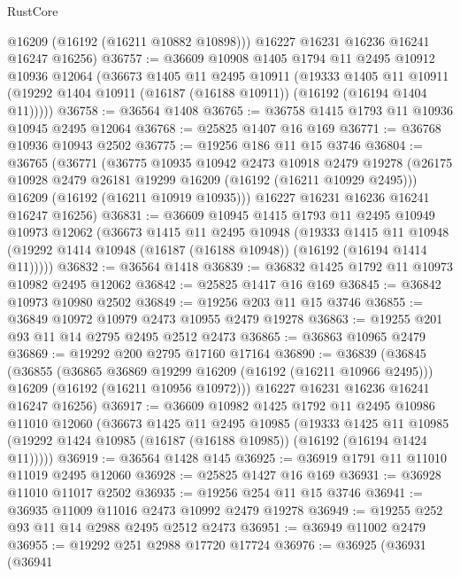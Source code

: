 \begin{lexlean}{RustCore}
\begin{coremodule}
        @16209
        (@16192 (@16211 @10882 @10898)))
      @16227
      @16231
      @16236
      @16241
      @16247
      @16256)
@36757 := @36609
    @10908
    @1405
    @1794
    @11
    @2495
    @10912
    @10936
    @12064
    (@36673
      @1405
      @11
      @2495
      @10911
      (@19333
        @1405
        @11
        @10911
        (@19292 @1404 @10911 (@16187 (@16188 @10911)) (@16192 (@16194 @1404 @11)))))
@36758 := @36564 @1408
@36765 := @36758 @1415 @1793 @11 @10936 @10945 @2495 @12064
@36768 := @25825 @1407 @16 @169
@36771 := @36768 @10936 @10943 @2502
@36775 := @19256 @186 @11 @15 @3746
@36804 := @36765
    (@36771
      (@36775
        @10935
        @10942
        @2473
        @10918
        @2479
        @19278
        (@26175 @10928 @2479 @26181 @19299 @16209 (@16192 (@16211 @10929 @2495)))
        @16209
        (@16192 (@16211 @10919 @10935)))
      @16227
      @16231
      @16236
      @16241
      @16247
      @16256)
@36831 := @36609
    @10945
    @1415
    @1793
    @11
    @2495
    @10949
    @10973
    @12062
    (@36673
      @1415
      @11
      @2495
      @10948
      (@19333
        @1415
        @11
        @10948
        (@19292 @1414 @10948 (@16187 (@16188 @10948)) (@16192 (@16194 @1414 @11)))))
@36832 := @36564 @1418
@36839 := @36832 @1425 @1792 @11 @10973 @10982 @2495 @12062
@36842 := @25825 @1417 @16 @169
@36845 := @36842 @10973 @10980 @2502
@36849 := @19256 @203 @11 @15 @3746
@36855 := @36849 @10972 @10979 @2473 @10955 @2479 @19278
@36863 := @19255 @201 @93 @11 @14 @2795 @2495 @2512 @2473
@36865 := @36863 @10965 @2479
@36869 := @19292 @200 @2795 @17160 @17164
@36890 := @36839
    (@36845
      (@36855
        (@36865 @36869 @19299 @16209 (@16192 (@16211 @10966 @2495)))
        @16209
        (@16192 (@16211 @10956 @10972)))
      @16227
      @16231
      @16236
      @16241
      @16247
      @16256)
@36917 := @36609
    @10982
    @1425
    @1792
    @11
    @2495
    @10986
    @11010
    @12060
    (@36673
      @1425
      @11
      @2495
      @10985
      (@19333
        @1425
        @11
        @10985
        (@19292 @1424 @10985 (@16187 (@16188 @10985)) (@16192 (@16194 @1424 @11)))))
@36919 := @36564 @1428 @145
@36925 := @36919 @1791 @11 @11010 @11019 @2495 @12060
@36928 := @25825 @1427 @16 @169
@36931 := @36928 @11010 @11017 @2502
@36935 := @19256 @254 @11 @15 @3746
@36941 := @36935 @11009 @11016 @2473 @10992 @2479 @19278
@36949 := @19255 @252 @93 @11 @14 @2988 @2495 @2512 @2473
@36951 := @36949 @11002 @2479
@36955 := @19292 @251 @2988 @17720 @17724
@36976 := @36925
    (@36931
      (@36941

\end{coremodule}
\end{lexlean}
